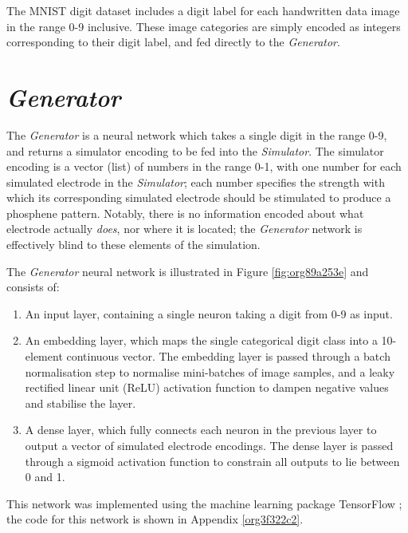 \documentclass[a4paper,11pt,openany]{book}
\begin{document}
The MNIST digit dataset includes a digit label for each handwritten data image in the range 0-9 inclusive.
These image categories are simply encoded as integers corresponding to their digit label, and fed directly to the \emph{Generator}.

\section*{\emph{Generator}}
\label{sec:org800a3cc}

The \emph{Generator} is a neural network which takes a single digit in the range 0-9, and returns a simulator encoding to be fed into the \emph{Simulator}.
The simulator encoding is a vector (list) of numbers in the range 0-1, with one number for each simulated electrode in the \emph{Simulator}; each number specifies the strength with which its corresponding simulated electrode should be stimulated to produce a phosphene pattern.
Notably, there is no information encoded about what electrode actually \emph{does}, nor where it is located; the \emph{Generator} network is effectively blind to these elements of the simulation.

The \emph{Generator} neural network is illustrated in Figure \ref{fig:org89a253e} and consists of:
\begin{enumerate}
\item An input layer, containing a single neuron taking a digit from 0-9 as input.
\item An embedding layer, which maps the single categorical digit class into a 10-element continuous vector.
The embedding layer is passed through a batch normalisation step to normalise mini-batches of image samples, and a leaky rectified linear unit (ReLU) activation function to dampen negative values and stabilise the layer.
\item A dense layer, which fully connects each neuron in the previous layer to output a vector of simulated electrode encodings.
The dense layer is passed through a sigmoid activation function to constrain all outputs to lie between 0 and 1.
\end{enumerate}

This network was implemented using the machine learning package TensorFlow \cite{tensorflow2015-whitepaper}; the code for this network is shown in Appendix \ref{org3f322c2}.
\end{document}
